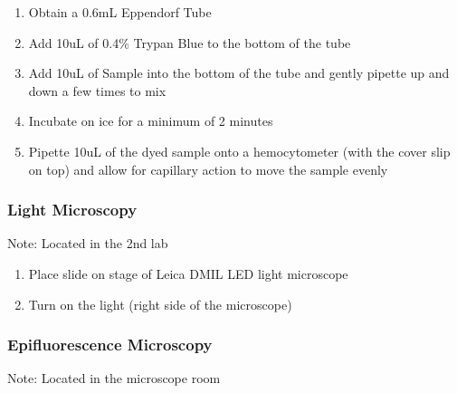 \documentclass[
]{article}
\providecommand{\tightlist}{%
  \setlength{\itemsep}{0pt}\setlength{\parskip}{0pt}}
\begin{document}
\begin{enumerate}
\def\labelenumi{\arabic{enumi}.}
\setcounter{enumi}{29}
\tightlist
\item
  Obtain a 0.6mL Eppendorf Tube
\item
  Add 10uL of 0.4\% Trypan Blue to the bottom of the tube
\item
  Add 10uL of Sample into the bottom of the tube and gently pipette up
  and down a few times to mix
\item
  Incubate on ice for a minimum of 2 minutes
\item
  Pipette 10uL of the dyed sample onto a hemocytometer (with the cover
  slip on top) and allow for capillary action to move the sample evenly
\end{enumerate}

\subsubsection{Light Microscopy}\label{light-microscopy}

Note: Located in the 2nd lab

\begin{enumerate}
\def\labelenumi{\arabic{enumi}.}
\setcounter{enumi}{34}
\tightlist
\item
  Place slide on stage of Leica DMIL LED light microscope
\item
  Turn on the light (right side of the microscope)
\end{enumerate}

\subsubsection{Epifluorescence
Microscopy}\label{epifluorescence-microscopy}

Note: Located in the microscope room
\end{document}
